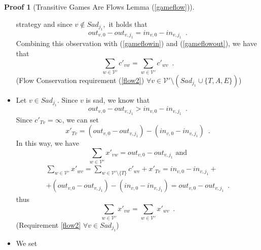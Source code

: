 \documentclass[11pt]{llncs}
\theoremstyle{definition}
\newtheorem{sepproof}{Proof}
\begin{document}
\begin{sepproof}[Transitive Games Are Flows Lemma (\ref{gameflow})]
\begin{itemize}
          strategy and since $v \notin Sad_{j_1},$ it holds that
          \begin{equation*}
             out_{v, 0} - out_{v, j_1} = in_{v, 0} - in_{v, j_1} \enspace.
          \end{equation*}
          Combining this observation with (\ref{gameflowin}) and (\ref{gameflowout}), we have that
          \begin{equation*}
             \sum\limits_{w \in \mathcal{V}'}c'_{vw} = \sum\limits_{w \in \mathcal{V}'}c'_{wv} \enspace.
          \end{equation*}
          (Flow Conservation requirement (\ref{flow2}) $\forall v \in \mathcal{V}' \setminus \left(Sad_{j_1}
          \cup \{T, A, E\}\right)$)
          \item Let $v \in Sad_{j_1}$. Since $v$ is sad, we know that
          \begin{equation*}
             out_{v, 0} - out_{v, j_1} > in_{v, 0} - in_{v, j_1} \enspace.
          \end{equation*}
          Since $c'_{Tv} = \infty$, we can set
          \begin{equation*}
             x'_{Tv} = \left(out_{v, 0} - out_{v, j_1}\right) - \left(in_{v, 0} - in_{v, j_1}\right) \enspace.
          \end{equation*}
          In this way, we have
          \begin{equation*}
             \sum\limits_{w \in \mathcal{V}'}x'_{vw} = out_{v, 0} - out_{v, j_1} \mbox{ and}
          \end{equation*}
          \begin{equation*}
          \begin{gathered}
             \sum\limits_{w \in \mathcal{V}'}x'_{wv} = \sum\limits_{w \in \mathcal{V}' \setminus \{T\}}c'_{wv} + x'_{Tv} =
             in_{v, 0} - in_{v, j_1} + \\ + (out_{v, 0} - out_{v, j_1}) - (in_{v, 0} - in_{v, j_1}) = out_{v, 0} -
             out_{v, j_1} \enspace.
          \end{gathered}
          \end{equation*}
          thus
          \begin{equation*}
             \sum\limits_{w \in \mathcal{V}'}x'_{vw} = \sum\limits_{w \in \mathcal{V}'}x'_{wv} \enspace.
          \end{equation*}
          (Requirement \ref{flow2} $\forall v \in Sad_{j_1}$)
          \item We set
          \begin{equation*}

\end{equation*}
\end{itemize}
\end{sepproof}
\end{document}
